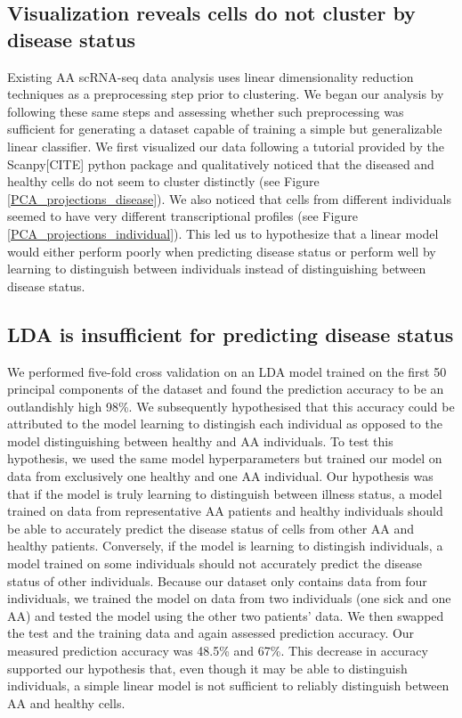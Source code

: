 \documentclass{article}
\begin{document}
\subsection{Visualization reveals cells do not cluster by disease status}
Existing AA scRNA-seq data analysis uses linear dimensionality reduction techniques as a preprocessing step prior to clustering.
We began our analysis by following these same steps and assessing whether such preprocessing was sufficient for generating a dataset capable of training a simple but generalizable linear classifier.
We first visualized our data following a tutorial provided by the Scanpy[CITE] python package and qualitatively noticed that the diseased and healthy cells do not seem to cluster distinctly (see Figure \ref{PCA_projections_disease}).
We also noticed that cells from different individuals seemed to have very different transcriptional profiles (see Figure \ref{PCA_projections_individual}).
This led us to hypothesize that a linear model would either perform poorly when predicting disease status or perform well by learning to distinguish between individuals instead of distinguishing between disease status.

\subsection{LDA is insufficient for predicting disease status}
We performed five-fold cross validation on an LDA model trained on the first 50 principal components of the dataset and found the prediction accuracy to be an outlandishly high 98\%.
We subsequently hypothesised that this accuracy could be attributed to the model learning to distingish each individual as opposed to the model distinguishing between healthy and AA individuals.
To test this hypothesis, we used the same model hyperparameters but trained our model on data from exclusively one healthy and one AA individual.
Our hypothesis was that if the model is truly learning to distinguish between illness status, a model trained on data from representative AA patients and healthy individuals should be able to accurately predict the disease status of cells from other AA and healthy patients.
Conversely, if the model is learning to distingish individuals, a model trained on some individuals should not accurately predict the disease status of other individuals.
Because our dataset only contains data from four individuals, we trained the model on data from two individuals (one sick and one AA) and tested the model using the other two patients' data.
We then swapped the test and the training data and again assessed prediction accuracy.
Our measured prediction accuracy was 48.5\% and 67\%.
This decrease in accuracy supported our hypothesis that, even though it may be able to distinguish individuals, a simple linear model is not sufficient to reliably distinguish between AA and healthy cells.
\end{document}
